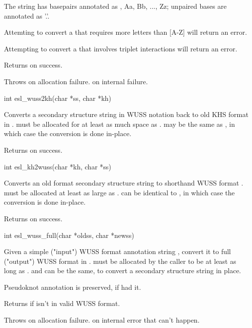\begin{sreapi}
The string  has basepairs annotated as \ccode{}, Aa, Bb, ..., Zz;
unpaired bases are annotated as '.'.

Attemting to convert a  that requires more letters
than [A-Z] will return an  error.

Attempting to convert a  that involves triplet interactions
will return an  error.

Returns  on success.

Throws  on allocation failure.
 on internal failure.


\hypertarget{func:esl_wuss2kh()}
{\item[int esl\_wuss2kh(char *ss, char *kh)]}

Converts a secondary structure string  in 
WUSS notation back to old KHS format in .
 must be allocated for at least as much
space as .  may be the same as ,
in which case the conversion is done in-place.

Returns  on success.


\hypertarget{func:esl_kh2wuss()}
{\item[int esl\_kh2wuss(char *kh, char *ss)]}

Converts an old format secondary structure string 
to shorthand WUSS format .  must be allocated at least
as large as .  can be identical to , in which
case the conversion is done in-place.

Returns  on success.


\hypertarget{func:esl_wuss_full()}
{\item[int esl\_wuss\_full(char *oldss, char *newss)]}

Given a simple ("input") WUSS format annotation string ,
convert it to full ("output") WUSS format in .
 must be allocated by the caller to be at least as 
long as .  and  can be the same,
to convert a secondary structure string in place.

Pseudoknot annotation is preserved, if  had it.

Returns  if  isn't in valid WUSS format.

Throws  on allocation failure.
 on internal error that can't happen.



\end{sreapi}
